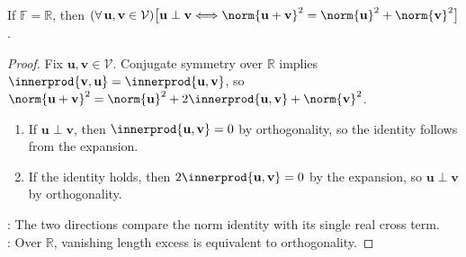 \begin{proposition} \label{prop:pythagorean-converse-real-inner-products} \\
If $\mathbb{F}=\mathbb{R}$, then $(\forall\,\mathbf{u},\mathbf{v}\in\mathcal{V})\bigl[\mathbf{u}\perp\mathbf{v}\Longleftrightarrow\norm{\mathbf{u}+\mathbf{v}}^2=\norm{\mathbf{u}}^2+\norm{\mathbf{v}}^2\bigr]$.
\begin{proof}
Fix $\mathbf{u},\mathbf{v}\in\mathcal{V}$. Conjugate symmetry over $\mathbb{R}$ implies $\innerprod{\mathbf{v},\mathbf{u}}=\innerprod{\mathbf{u},\mathbf{v}}$, so $\norm{\mathbf{u}+\mathbf{v}}^2=\norm{\mathbf{u}}^2+2\innerprod{\mathbf{u},\mathbf{v}}+\norm{\mathbf{v}}^2$.
\begin{enumerate}[label=\roman*.]
\setlength{\itemsep}{0pt}
\item[$(\Rightarrow)$] If $\mathbf{u}\perp\mathbf{v}$, then $\innerprod{\mathbf{u},\mathbf{v}}=0$ by orthogonality, so the identity follows from the expansion.
\item[$(\Leftarrow)$] If the identity holds, then $2\innerprod{\mathbf{u},\mathbf{v}}=0$ by the expansion, so $\mathbf{u}\perp\mathbf{v}$ by orthogonality.
\end{enumerate}
: The two directions compare the norm identity with its single real cross term.\\
: Over $\mathbb{R}$, vanishing length excess is equivalent to orthogonality.
\end{proof}
\end{proposition}

